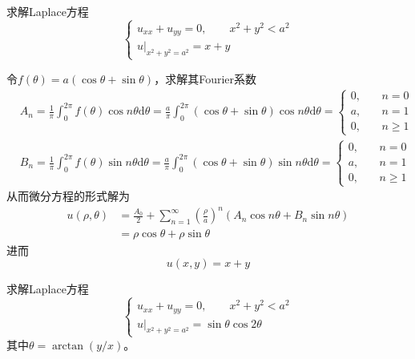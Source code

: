 \documentclass[lang = cn, scheme = chinese, thmcnt = section]{elegantbook}
\newcommand{\dd}{\mathrm{d}}           %
\begin{document}
\begin{example}
	求解Laplace方程
	$$
	\begin{cases}
		u_{xx}+u_{yy}=0,\qquad x^2+y^2<a^2\\
		u|_{x^2+y^2=a^2}=x+y
	\end{cases}
	$$
\end{example}

\begin{solution}
	令$f(\theta)=a(\cos\theta+\sin\theta)$，求解其Fourier系数
	\begin{align*}
		& A_n
		=\frac{1}{\pi}\int_{0}^{2\pi}f(\theta)\cos n \theta\dd \theta
		=\frac{a}{\pi}\int_{0}^{2\pi}(\cos\theta+\sin\theta)\cos n \theta\dd\theta
		=\begin{cases}
			0,\quad & n = 0\\
			a,\quad & n = 1\\
			0,\quad & n\ge 1
		\end{cases}\\
		& B_n
		=\frac{1}{\pi}\int_{0}^{2\pi}f(\theta)\sin n\theta\dd\theta
		=\frac{a}{\pi}\int_{0}^{2\pi}(\cos\theta+\sin\theta)\sin n\theta\dd \theta
		=\begin{cases}
			0,\quad & n = 0\\
			a,\quad & n = 1\\
			0,\quad & n\ge 1
		\end{cases}
	\end{align*}
	从而微分方程的形式解为
	\begin{align*}
		u(\rho,\theta)
		& = \frac{A_0}{2}+\sum_{n=1}^{\infty}\left(\frac{\rho}{a}\right)^n\left(A_n\cos n\theta+B_n\sin n\theta\right)\\
		& =\rho\cos\theta+\rho\sin\theta
	\end{align*}
	进而
	$$
	u(x,y)=x+y
	$$
\end{solution}

\begin{example}
	求解Laplace方程
	$$
	\begin{cases}
		u_{xx}+u_{yy}=0,\qquad x^2+y^2<a^2\\
		u|_{x^2+y^2=a^2}=\sin\theta\cos2\theta
	\end{cases}
	$$
	其中$\theta=\arctan(y/x)$。
\end{example}
\end{document}
